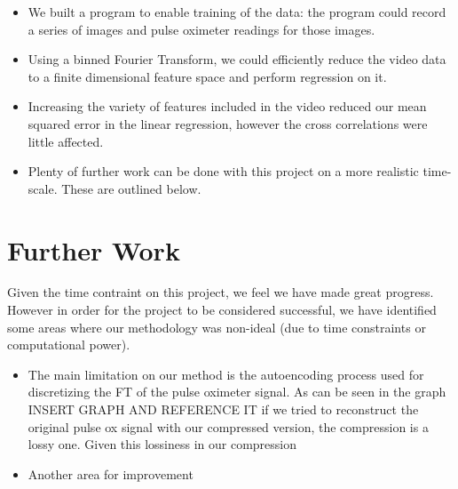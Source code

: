 \documentclass[12pt]{article}
\begin{document}
 \begin{itemize}

  \item{We built a program to enable training of the data: the program could record a series of images and pulse oximeter readings for those images.} 
  \item{Using a binned Fourier Transform, we could efficiently reduce the video data to a finite dimensional feature space and perform regression on it.}
\item{Increasing the variety of features included in the video reduced our mean squared error in the linear regression, however the cross correlations were little affected.}
\item{Plenty of further work can be done with this project on a more realistic time-scale. These are outlined below.}
 \end{itemize}

 \section{Further Work}
  Given the time contraint on this project, we feel we have made great progress.
 However in order for the project to be considered successful, we have identified some areas where our methodology was non-ideal (due to time constraints or computational power).
 \begin{itemize}
 \item{The main limitation on our method is the autoencoding process used for discretizing the FT of the pulse oximeter signal. As can be seen in the graph INSERT GRAPH AND REFERENCE IT if we tried to reconstruct the original pulse ox signal with our compressed version, the compression is a lossy one. Given this lossiness in our compression}
 \item{Another area for improvement}
 
 \end{itemize}
 

  
\end{document}
